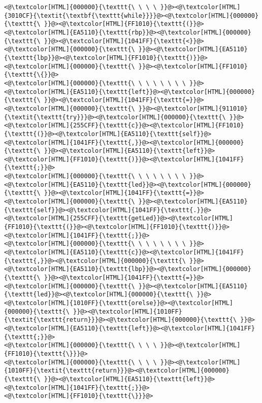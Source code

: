\begin{lstlisting}
<@\textcolor[HTML]{000000}{\texttt{\ \ \ \ }}@><@\textcolor[HTML]{3010CF}{\textit{\textbf{\texttt{while}}}}@><@\textcolor[HTML]{000000}{\texttt{\ }}@><@\textcolor[HTML]{FF1010}{\texttt{(}}@><@\textcolor[HTML]{EA5110}{\texttt{rbp}}@><@\textcolor[HTML]{000000}{\texttt{\ }}@><@\textcolor[HTML]{1041FF}{\texttt{<}}@><@\textcolor[HTML]{000000}{\texttt{\ }}@><@\textcolor[HTML]{EA5110}{\texttt{lbp}}@><@\textcolor[HTML]{FF1010}{\texttt{)}}@><@\textcolor[HTML]{000000}{\texttt{\ }}@><@\textcolor[HTML]{FF1010}{\texttt{\{}}@>
<@\textcolor[HTML]{000000}{\texttt{\ \ \ \ \ \ \ \ }}@><@\textcolor[HTML]{EA5110}{\texttt{left}}@><@\textcolor[HTML]{000000}{\texttt{\ }}@><@\textcolor[HTML]{1041FF}{\texttt{=}}@><@\textcolor[HTML]{000000}{\texttt{\ }}@><@\textcolor[HTML]{911010}{\textit{\texttt{try}}}@><@\textcolor[HTML]{000000}{\texttt{\ }}@><@\textcolor[HTML]{255CFF}{\texttt{c}}@><@\textcolor[HTML]{FF1010}{\texttt{(}}@><@\textcolor[HTML]{EA5110}{\texttt{self}}@><@\textcolor[HTML]{1041FF}{\texttt{,}}@><@\textcolor[HTML]{000000}{\texttt{\ }}@><@\textcolor[HTML]{EA5110}{\texttt{left}}@><@\textcolor[HTML]{FF1010}{\texttt{)}}@><@\textcolor[HTML]{1041FF}{\texttt{;}}@>
<@\textcolor[HTML]{000000}{\texttt{\ \ \ \ \ \ \ \ }}@><@\textcolor[HTML]{EA5110}{\texttt{led}}@><@\textcolor[HTML]{000000}{\texttt{\ }}@><@\textcolor[HTML]{1041FF}{\texttt{=}}@><@\textcolor[HTML]{000000}{\texttt{\ }}@><@\textcolor[HTML]{EA5110}{\texttt{self}}@><@\textcolor[HTML]{1041FF}{\texttt{.}}@><@\textcolor[HTML]{255CFF}{\texttt{getLed}}@><@\textcolor[HTML]{FF1010}{\texttt{(}}@><@\textcolor[HTML]{FF1010}{\texttt{)}}@><@\textcolor[HTML]{1041FF}{\texttt{;}}@>
<@\textcolor[HTML]{000000}{\texttt{\ \ \ \ \ \ \ \ }}@><@\textcolor[HTML]{EA5110}{\texttt{c}}@><@\textcolor[HTML]{1041FF}{\texttt{,}}@><@\textcolor[HTML]{000000}{\texttt{\ }}@><@\textcolor[HTML]{EA5110}{\texttt{lbp}}@><@\textcolor[HTML]{000000}{\texttt{\ }}@><@\textcolor[HTML]{1041FF}{\texttt{=}}@><@\textcolor[HTML]{000000}{\texttt{\ }}@><@\textcolor[HTML]{EA5110}{\texttt{led}}@><@\textcolor[HTML]{000000}{\texttt{\ }}@><@\textcolor[HTML]{1010FF}{\texttt{orelse}}@><@\textcolor[HTML]{000000}{\texttt{\ }}@><@\textcolor[HTML]{1010FF}{\textit{\texttt{return}}}@><@\textcolor[HTML]{000000}{\texttt{\ }}@><@\textcolor[HTML]{EA5110}{\texttt{left}}@><@\textcolor[HTML]{1041FF}{\texttt{;}}@>
<@\textcolor[HTML]{000000}{\texttt{\ \ \ \ }}@><@\textcolor[HTML]{FF1010}{\texttt{\}}}@>
<@\textcolor[HTML]{000000}{\texttt{\ \ \ \ }}@><@\textcolor[HTML]{1010FF}{\textit{\texttt{return}}}@><@\textcolor[HTML]{000000}{\texttt{\ }}@><@\textcolor[HTML]{EA5110}{\texttt{left}}@><@\textcolor[HTML]{1041FF}{\texttt{;}}@>
<@\textcolor[HTML]{FF1010}{\texttt{\}}}@>

\end{lstlisting}